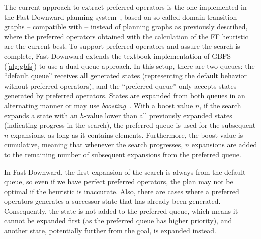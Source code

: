\documentclass[ppgc,diss,english]{iiufrgs}
\begin{document}
The current approach to extract preferred operators is the one implemented in the Fast Downward planning system~\cite{Helmert/2009}, based on so-called domain transition graphs -- compatible with \sas -- instead of planning graphs as previously described, where the preferred operators obtained with the calculation of the FF heuristic are the current best. %
To support preferred operators and assure the search is complete, Fast Downward extends the textbook implementation of GBFS (\cref{alg:gbfs}) to use a dual-queue approach. In this setup, there are two queues: the ``default queue'' receives all generated states (representing the default behavior without preferred operators), and the ``preferred queue'' only accepts states generated by preferred operators. States are expanded from both queues in an alternating manner or may use \emph{boosting}~\cite{Richter.Helmert/2009}. With a boost value $n$, if the search expands a state with an $h$-value lower than all previously expanded states (indicating progress in the search), the preferred queue is used for the subsequent $n$ expansions, as long as it contains elements. Furthermore, the boost value is cumulative, meaning that whenever the search progresses, $n$ expansions are added to the remaining number of subsequent expansions from the preferred queue.

In Fast Downward, the first expansion of the search is always from the default queue, so even if we have perfect preferred operators, the plan may not be optimal if the heuristic is inaccurate. Also, there are cases where a preferred operators generates a successor state that has already been generated. Consequently, the state is not added to the preferred queue, which means it cannot be expanded first (as the preferred queue has higher priority), and another state, potentially further from the goal, is expanded instead.
\end{document}
